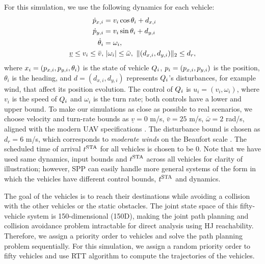 For this simulation, we use the following dynamics for each vehicle:
\begin{equation}
\label{eq:dyn_i}
\begin{aligned}
\dot{p}_{x,i} &= v_i \cos \theta_i + d_{x,i} \\
\dot{p}_{y,i} &= v_i \sin \theta_i + d_{y,i}\\
\dot{\theta}_i &= \omega_i, \\
\underline{v} \le v_i \le \bar{v}, & ~|\omega_i| \le \bar{\omega}, ~\|(d_{x,i}, d_{y,i}) \|_2 \le d_{r},
\end{aligned}
\end{equation}
\noindent where $x_i = (p_{x,i}, p_{y,i}, \theta_i)$ is the state of vehicle $Q_i$, $p_i = (p_{x,i}, p_{y,i})$ is the position, $\theta_i$ is the heading, and $d = (d_{x,i}, d_{y,i})$ represents $Q_i$'s disturbances, for example wind, that affect its position evolution. The control of $Q_i$ is $u_i = (v_i, \omega_i)$, where $v_i$ is the speed of $Q_i$ and $\omega_i$ is the turn rate; both controls have a lower and upper bound. To make our simulations as close as possible to real scenarios, we choose velocity and turn-rate bounds as $\underline{v} = 0$ m/s, $\bar{v} = 25$ m/s, $\bar\omega = 2$ rad/s, aligned with the modern UAV specifications \cite{UAVspecs1, UAVspecs2}. The disturbance bound is chosen as $d_r = 6$ m/s, which corresponds to \textit{moderate winds} on the Beaufort scale \cite{Windscale}. The scheduled time of arrival $t^\text{STA}$ for all vehicles is chosen to be $0$. Note that we have used same dynamics, input bounds and $t^\text{STA}$ across all vehicles for clarity of illustration; however, SPP can easily handle more general systems of the form in which the vehicles have different control bounds, $t^\text{STA}$ and dynamics.

The goal of the vehicles is to reach their destinations while avoiding a collision with the other vehicles or the static obstacles. The joint state space of this fifty-vehicle system is 150-dimensional (150D), making the joint path planning and collision avoidance problem intractable for direct analysis using HJ reachability. Therefore, we assign a priority order to vehicles and solve the path planning problem sequentially. For this simulation, we assign a random priority order to fifty vehicles and use RTT algorithm to compute the trajectories of the vehicles. 
